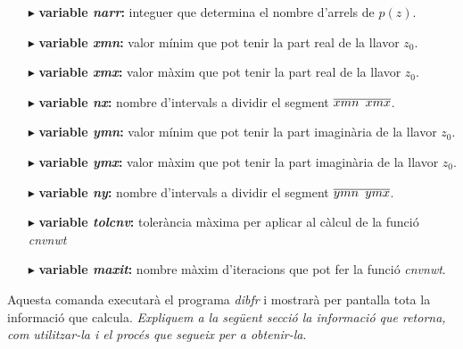 \documentclass[12pt]{report}
\begin{document}
\begin{itemize}
    \item [$\blacktriangleright$] \textbf{variable \textit{narr}:} integuer que determina el nombre d'arrels de $p(z)$.
    \item [$\blacktriangleright$] \textbf{variable \textit{xmn}:} valor mínim que pot tenir la part real de la llavor $z_0$.
    \item [$\blacktriangleright$] \textbf{variable \textit{xmx}:} valor màxim que pot tenir la part real de la llavor $z_0$.
    \item [$\blacktriangleright$] \textbf{variable \textit{nx}:} nombre d'intervals a dividir el segment $\overline{xmn \hspace{0.5em} xmx}$.
    \item [$\blacktriangleright$] \textbf{variable \textit{ymn}:} valor mínim que pot tenir la part imaginària de la llavor $z_0$.
    \item [$\blacktriangleright$] \textbf{variable \textit{ymx}:} valor màxim que pot tenir la part imaginària de la llavor $z_0$.
    \item [$\blacktriangleright$] \textbf{variable \textit{ny}:} nombre d'intervals a dividir el segment $\overline{ymn \hspace{0.5em} ymx}$.
    \item [$\blacktriangleright$] \textbf{variable \textit{tolcnv}:} tolerància màxima per aplicar al càlcul de la funció \textit{cnvnwt}
    \item [$\blacktriangleright$] \textbf{variable \textit{maxit}:} nombre màxim d'iteracions que pot fer la funció \textit{cnvnwt}.
\end{itemize}
Aquesta comanda executarà el programa \textit{dibfr} i mostrarà per pantalla tota la informació que calcula.
\newline
\textit{Expliquem a la següent secció la informació que retorna, com utilitzar-la i el procés que segueix per a obtenir-la}.

\end{document}
